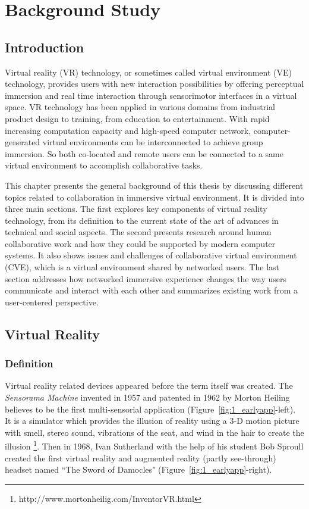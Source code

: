 \chapter{Background Study}
\label{chapter:context}
\minitoc

\section{Introduction}
Virtual reality (VR) technology, or sometimes called virtual environment (VE) technology, provides users with new interaction possibilities by offering perceptual immersion and real time interaction through sensorimotor interfaces in a virtual space. VR technology has been applied in various domains from industrial product design to training, from education to entertainment. With rapid increasing computation capacity and high-speed computer network, computer-generated virtual environments can be interconnected to achieve group immersion. So both co-located and remote users can be connected to a same virtual environment to accomplish collaborative tasks. 
 
This chapter presents the general background of this thesis by discussing different topics related to collaboration in immersive virtual environment. It is divided into three main sections. The first explores key components of virtual reality technology, from its definition to the current state of the art of advances in technical and social aspects. The second presents research around human collaborative work and how they could be supported by modern computer systems. It also shows issues and challenges of collaborative virtual environment (CVE), which is a virtual environment shared by networked users. The last section addresses how networked immersive experience changes the way users communicate and interact with each other and summarizes existing work from a user-centered perspective.


\section{Virtual Reality}
\subsection{Definition}
Virtual reality related devices appeared before the term itself was created. The \textit{Sensorama Machine} invented in 1957 and patented in 1962 by Morton Heiling believes to be the first multi-sensorial application (Figure~\ref{fig:1_earlyapp}-left). It is a simulator which provides the illusion of reality using a 3-D motion picture with smell, stereo sound, vibrations of the seat, and wind in the hair to create the illusion \footnote{http://www.mortonheilig.com/InventorVR.html}. Then in 1968, Ivan Sutherland with the help of his student Bob Sproull created the first virtual reality and augmented reality (partly see-through) headset named ``The Sword of Damocles" \citep{Sutherland1968Hmd} (Figure~\ref{fig:1_earlyapp}-right).

